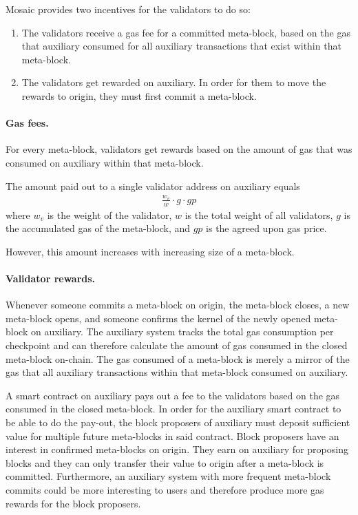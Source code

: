 \documentclass[12pt,a4paper]{article}
\begin{document}
Mosaic provides two incentives for the validators to do so:

\begin{enumerate}
	\item The validators receive a gas fee for a committed meta-block, based on the gas that auxiliary consumed for all auxiliary transactions that exist within that meta-block.
	\item The validators get rewarded on auxiliary. In order for them to move the rewards to origin, they must first commit a meta-block.
\end{enumerate}

\paragraph{Gas fees.}
For every meta-block, validators get rewards based on the amount of gas that was consumed on auxiliary within that meta-block.

The amount paid out to a single validator address on auxiliary equals
\begin{align*}
  \frac{w_v}{w} \cdot g \cdot gp
\end{align*}
where $w_v$ is the weight of the validator, $w$ is the total weight of all validators, $g$ is the accumulated gas of the meta-block, and $gp$ is the agreed upon gas price.

However, this amount increases with increasing size of a meta-block.

\paragraph{Validator rewards.}
Whenever someone commits a meta-block on origin, the meta-block closes, a new meta-block opens, and someone confirms the kernel of the newly opened meta-block on auxiliary.
The auxiliary system tracks the total gas consumption per checkpoint and can therefore calculate the amount of gas consumed in the closed meta-block on-chain.
The gas consumed of a meta-block is merely a mirror of the gas that all auxiliary transactions within that meta-block consumed on auxiliary.

A smart contract on auxiliary pays out a fee to the validators based on the gas consumed in the closed meta-block.
In order for the auxiliary smart contract to be able to do the pay-out, the block proposers of auxiliary must deposit sufficient value for multiple future meta-blocks in said contract.
Block proposers have an interest in confirmed meta-blocks on origin.
They earn on auxiliary for proposing blocks and they can only transfer their value to origin after a meta-block is committed.
Furthermore, an auxiliary system with more frequent meta-block commits could be more interesting to users and therefore produce more gas rewards for the block proposers.
\end{document}
